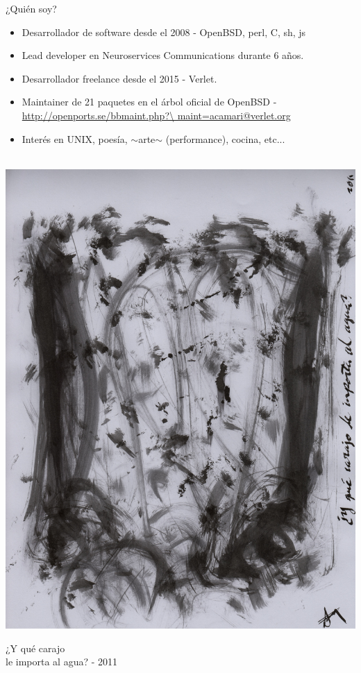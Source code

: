 \documentclass[11pt,spanish]{article}
\newcommand{\fr}[1]{%
	\begin{flushright}
		#1
	\end{flushright}
}
\newcommand{\rowsp}[1][1em]{\vspace{#1}}
\newcommand{\hone}[1]{{\rowsp[0.3em]\noindent\Large #1 \rowsp[0.3em]}}
\newcommand{\myitm}[1]{\begin{itemize}#1\end{itemize}}
\begin{document}
\newpage %
\hone{¿Quién soy?}
\begin{Row}
\begin{Cell}{2}
\myitm{
	\item Desarrollador de software desde el 2008 - OpenBSD, perl, C, sh, js
	\item Lead developer en Neuroservices Communications durante 6 años.
	\item Desarrollador freelance desde el 2015 - Verlet.
	\item Maintainer de 21 paquetes en el árbol oficial de OpenBSD -
	\href{http://openports.se/bbmaint.php?maint=acamari@verlet.org}{
	      http://openports.se/bbmaint.php?\textbackslash{} maint=acamari@verlet.org}
	\item Interés en UNIX, poesía, $\sim$arte$\sim$ (performance), cocina, etc...
}
\end{Cell}

\begin{Cell}{1}
\ \\ %
\includegraphics[width=\textwidth]{img/carajo}
\fr{ {\tiny ¿Y qué carajo\\
le importa al agua? - 2011} }
\end{Cell}

\end{Row}
\end{document}
